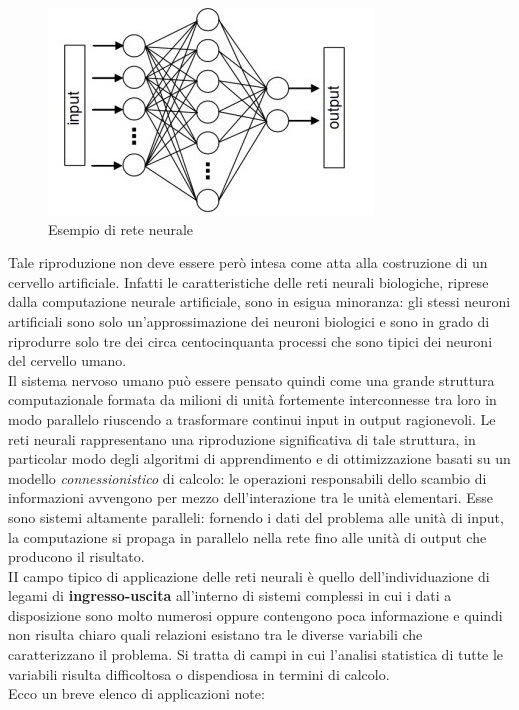 \documentclass[12pt,a4paper,oneside]{book}
\begin{document}
		\begin{figure}[h]
			\centering
			\includegraphics[width=0.5\linewidth]{IMMAGINI/esempioiniziale}
			\caption{Esempio di rete neurale}
			\label{fig:esempio}
		\end{figure}
	
		Tale riproduzione non deve essere però intesa come atta alla costruzione di un cervello artificiale. Infatti le caratteristiche delle reti neurali biologiche, riprese dalla computazione neurale artificiale, sono in esigua minoranza: gli stessi neuroni artificiali sono solo un’approssimazione dei neuroni biologici e sono in grado di riprodurre solo tre dei circa centocinquanta processi che sono tipici dei neuroni del cervello umano.
		\\Il sistema nervoso umano può essere pensato quindi come una grande struttura computazionale formata da milioni di unità fortemente interconnesse tra loro in modo parallelo riuscendo a trasformare continui input in output ragionevoli. Le reti neurali rappresentano una riproduzione significativa di tale struttura, in particolar modo degli algoritmi di apprendimento e di ottimizzazione basati su un modello \emph{connessionistico} di calcolo: le operazioni responsabili dello scambio di informazioni avvengono per mezzo dell'interazione tra le unità elementari. Esse sono sistemi altamente paralleli: fornendo i dati del problema alle unità di input, la computazione si propaga in parallelo nella rete fino alle unità di output che producono il risultato.\\
		II campo tipico di applicazione delle reti neurali è quello dell'individuazione di legami di \textbf{ingresso-uscita} all'interno di sistemi complessi in cui i dati a disposizione sono molto 
		numerosi oppure contengono poca informazione e quindi non risulta chiaro quali relazioni esistano tra le diverse variabili che caratterizzano il problema. Si tratta di campi in cui l'analisi statistica di tutte le variabili risulta difficoltosa o dispendiosa in termini di calcolo.\\ 
		Ecco un breve elenco di applicazioni note:
		
\end{document}

